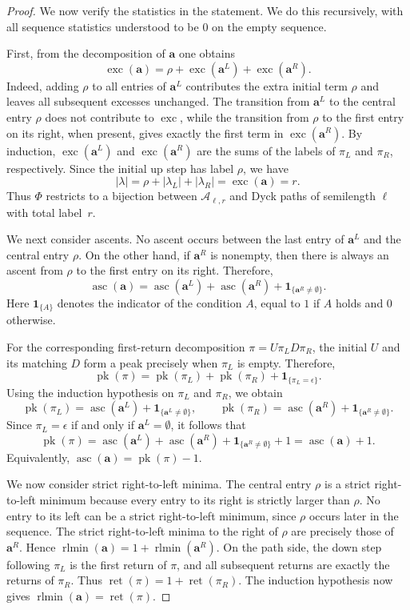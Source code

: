 \documentclass[12pt]{amsart}
\theoremstyle{plain}
\theoremstyle{definition}
\DeclareMathOperator{\pk}{pk}
\DeclareMathOperator{\ret}{ret}
\DeclareMathOperator{\asc}{asc}
\DeclareMathOperator{\rlmin}{rlmin}
\begin{document}
\begin{proof}
We now verify the statistics in the statement. We do this recursively,
with all sequence statistics understood to be $0$ on the empty sequence.

First, from the decomposition of $\mathbf a$ one obtains
\[
\operatorname{exc}(\mathbf a)
=
\rho+\operatorname{exc}(\mathbf a^L)+\operatorname{exc}(\mathbf a^R).
\]
Indeed, adding $\rho$ to all entries of $\mathbf a^L$ contributes the extra initial term $\rho$
and leaves all subsequent excesses unchanged. The transition from $\mathbf a^L$ to the central
entry $\rho$ does not contribute to $\operatorname{exc}$, while the transition from
$\rho$ to the first entry on its right, when present, gives exactly the
first term in $\operatorname{exc}(\mathbf{a}^{R})$.  By induction,
$\operatorname{exc}(\mathbf{a}^{L})$ and
$\operatorname{exc}(\mathbf{a}^{R})$ are the sums of the labels of
$\pi_L$ and $\pi_R$, respectively. Since the initial up step has label
$\rho$, we have
\[
|\lambda|
=
\rho+|\lambda_L|+|\lambda_R|
=
\operatorname{exc}(\mathbf{a})
=
r.
\]
Thus $\Phi$ restricts to a bijection between $\mathcal{A}_{\ell,r}$ and
Dyck paths of semilength $\ell$ with total label~$r$.

We next consider ascents. No ascent occurs between the last entry of
$\mathbf{a}^{L}$ and the central entry $\rho$. On the other hand, if
$\mathbf{a}^{R}$ is nonempty, then there is always an ascent from $\rho$
to the first entry on its right. Therefore,
\[
\asc(\mathbf{a})
=
\asc(\mathbf{a}^{L})
+
\asc(\mathbf{a}^{R})
+
\mathbf{1}_{\{\mathbf{a}^{R}\neq\emptyset\}}.
\]
Here $\mathbf{1}_{\{A\}}$ denotes the indicator of the condition $A$, equal to $1$ if $A$ holds and $0$ otherwise. 

For the corresponding first-return decomposition
$\pi=U\pi_LD\pi_R$, the initial $U$ and its matching $D$ form a peak
precisely when $\pi_L$ is empty. Therefore,
\[
\pk(\pi)
=
\pk(\pi_L)
+
\pk(\pi_R)
+
\mathbf{1}_{\{\pi_L=\epsilon\}}.
\]
Using the induction hypothesis on $\pi_L$ and $\pi_R$, we obtain
\[
\pk(\pi_L)
=
\asc(\mathbf a^L)
+
\mathbf{1}_{\{\mathbf a^L\neq\emptyset\}},
\qquad
\pk(\pi_R)
=
\asc(\mathbf a^R)
+
\mathbf{1}_{\{\mathbf a^R\neq\emptyset\}}.
\]
Since $\pi_L=\epsilon$ if and only if $\mathbf a^L=\emptyset$, it follows that
\[
\pk(\pi)
=
\asc(\mathbf a^L)
+
\asc(\mathbf a^R)
+
\mathbf{1}_{\{\mathbf a^R\neq\emptyset\}}
+1
=
\asc(\mathbf a)+1.
\]
Equivalently, $\asc(\mathbf{a})=\pk(\pi)-1$.

We now consider strict right-to-left minima. The central entry $\rho$ is
a strict right-to-left minimum because every entry to its right is
strictly larger than $\rho$. No entry to its left can be a strict
right-to-left minimum, since $\rho$ occurs later in the sequence. The strict
right-to-left minima to the right of $\rho$ are precisely those of
$\mathbf{a}^{R}$. Hence $\rlmin(\mathbf{a})
=
1+\rlmin(\mathbf{a}^{R})$. On the path side, the down step following $\pi_L$ is the first return of
$\pi$, and all subsequent returns are exactly the returns of $\pi_R$.
Thus $
\ret(\pi)
=
1+\ret(\pi_R)$. The induction hypothesis now gives $\rlmin(\mathbf{a})=\ret(\pi)$.


\end{proof}
\end{document}
